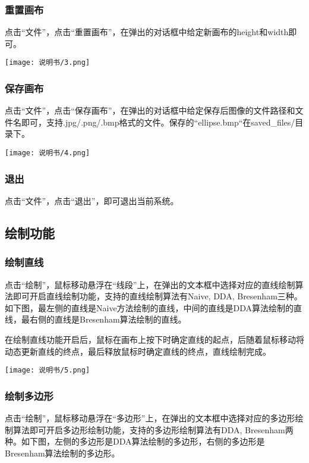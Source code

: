 \documentclass{article}
\begin{document}
		\subsubsection{重置画布}
		点击“文件”，点击“重置画布”，在弹出的对话框中给定新画布的height和width即可。
		\begin{center}
			\texttt{[image: 说明书/3.png]}
		\end{center}
	
		\subsubsection{保存画布}
		点击“文件”，点击“保存画布”，在弹出的对话框中给定保存后图像的文件路径和文件名即可，支持.jpg/.png/.bmp格式的文件。保存的“ellipse.bmp“在saved\_files/目录下。
		\begin{center}
			\texttt{[image: 说明书/4.png]}
		\end{center}
	
		\subsubsection{退出}
		点击“文件”，点击“退出”，即可退出当前系统。
		
		\subsection{绘制功能}
		\subsubsection{绘制直线}
		点击“绘制”，鼠标移动悬浮在“线段”上，在弹出的文本框中选择对应的直线绘制算法即可开启直线绘制功能，支持的直线绘制算法有Naive, DDA, Bresenham三种。如下图，最左侧的直线是Naive方法绘制的直线，中间的直线是DDA算法绘制的直线，最右侧的直线是Bresenham算法绘制的直线。
		
		在绘制直线功能开启后，鼠标在画布上按下时确定直线的起点，后随着鼠标移动将动态更新直线的终点，最后释放鼠标时确定直线的终点，直线绘制完成。
		\begin{center}
			\texttt{[image: 说明书/5.png]}
		\end{center}
		
		\subsubsection{绘制多边形}
		点击“绘制”，鼠标移动悬浮在“多边形”上，在弹出的文本框中选择对应的多边形绘制算法即可开启多边形绘制功能，支持的多边形绘制算法有DDA, Bresenham两种。如下图，左侧的多边形是DDA算法绘制的多边形，右侧的多边形是Bresenham算法绘制的多边形。
		
\end{document}
